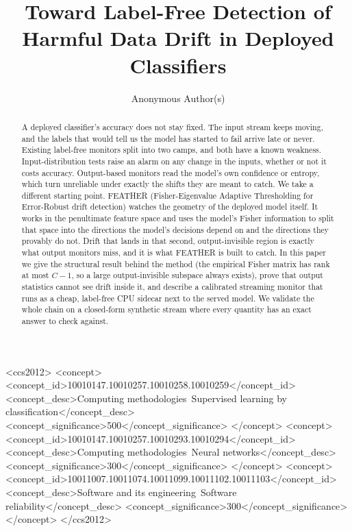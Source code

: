 \documentclass[sigconf,anonymous]{acmart}
\begin{document}
\title[Toward Label-Free Detection of Harmful Data Drift]{Toward Label-Free
Detection of Harmful Data Drift in Deployed Classifiers}

\author{Anonymous Author(s)}

\begin{abstract}
A deployed classifier's accuracy does not stay fixed. The input stream keeps
moving, and the labels that would tell us the model has started to fail
arrive late or never. Existing label-free monitors split into two camps, and
both have a known weakness. Input-distribution tests raise an alarm on any
change in the inputs, whether or not it costs accuracy. Output-based monitors
read the model's own confidence or entropy, which turn unreliable under
exactly the shifts they are meant to catch. We take a different starting
point. FEATHER (Fisher-Eigenvalue Adaptive Thresholding for Error-Robust
drift detection) watches the geometry of the deployed model itself. It works
in the penultimate feature space and uses the model's Fisher information to
split that space into the directions the model's decisions depend on and the
directions they provably do not. Drift that lands in that second,
output-invisible region is exactly what output monitors miss, and it is what
FEATHER is built to catch. In this paper we give the structural result behind
the method (the empirical Fisher matrix has rank at most $C-1$, so a large
output-invisible subspace always exists), prove that output statistics cannot
see drift inside it, and describe a calibrated streaming monitor that runs as
a cheap, label-free CPU sidecar next to the served model. We validate the
whole chain on a closed-form synthetic stream where every quantity has an
exact answer to check against.
\end{abstract}

\begin{CCSXML}
<ccs2012>
   <concept>
       <concept_id>10010147.10010257.10010258.10010259</concept_id>
       <concept_desc>Computing methodologies~Supervised learning by classification</concept_desc>
       <concept_significance>500</concept_significance>
       </concept>
   <concept>
       <concept_id>10010147.10010257.10010293.10010294</concept_id>
       <concept_desc>Computing methodologies~Neural networks</concept_desc>
       <concept_significance>300</concept_significance>
       </concept>
   <concept>
       <concept_id>10011007.10011074.10011099.10011102.10011103</concept_id>
       <concept_desc>Software and its engineering~Software reliability</concept_desc>
       <concept_significance>300</concept_significance>
       </concept>
 </ccs2012>
\end{CCSXML}
\end{document}
